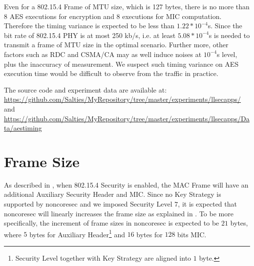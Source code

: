 Even for a 802.15.4 Frame of MTU size, which is 127 bytes, there is no more than $8$ AES executions for encryption and $8$ executions for MIC computation. Therefore the timing variance is expected to be less than  $1.22 * 10 ^ {-4}$s. Since the bit rate of 802.15.4 PHY is at most 250 kb/s\cite{802154}, i.e. at least $5.08 * 10^{-4}$s is needed to transmit a frame of MTU size in the optimal scenario. Further more, other factors such as RDC and CSMA/CA  may as well induce noises at $10^{-4}$s level, plus the inaccuracy of measurement. We suspect such timing variance on AES execution time would be difficult to observe from the traffic in practice.

The source code and experiment data are available at:\\
\url{https://github.com/Salties/MyRepository/tree/master/experiments/llsecapps/} \\
and \\
\url{https://github.com/Salties/MyRepository/tree/master/experiments/llsecapps/Data/aestiming}

%
%

\section{Frame Size} \label{noncoresec frame size}

As described in , when 802.15.4 Security is enabled, the MAC Frame will have an additional Auxiliary Security Header and MIC. Since no Key Strategy is supported by noncoresec and we imposed Security Level $7$, it is expected that noncoresec will linearly increases the frame size as explained in . To be more specifically, the increment of frame sizes in noncoresec is expected to be $21$ bytes, where $5$ bytes for Auxiliary Header\footnote{Security Level together with Key Strategy are aligned into $1$ byte.} and $16$ bytes for $128$ bits MIC.

